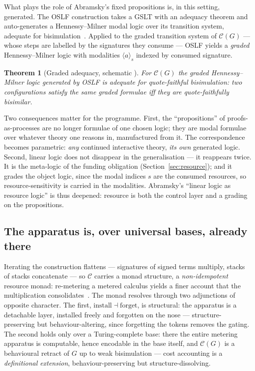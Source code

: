\documentclass[11pt]{article}
\theoremstyle{definition}
\theoremstyle{plain}
\newtheorem{theorem}[definition]{Theorem}
\newcommand{\C}{\mathcal{C}}
\begin{document}
What plays the role of Abramsky's fixed propositions is, in this setting,
generated. The OSLF construction takes a GSLT with an adequacy theorem and
auto-generates a Hennessy--Milner modal logic over its transition system, adequate
for bisimulation~\cite{HM85}. Applied to the graded transition system of $\C(G)$
--- whose steps are labelled by the signatures they consume --- OSLF yields a
\emph{graded} Hennessy--Milner logic with modalities $\langle a \rangle_s$
indexed by consumed signature.

\begin{theorem}[Graded adequacy, schematic {\cite{NoteII}}]
For $\C(G)$ the graded Hennessy--Milner logic generated by OSLF is adequate for
quote-faithful bisimulation: two configurations satisfy the same graded formulae
iff they are quote-faithfully bisimilar.
\end{theorem}

Two consequences matter for the programme. First, the ``propositions'' of
proofs-as-processes are no longer formulae of one chosen logic; they are modal
formulae over whatever theory one reasons in, manufactured from it. The
correspondence becomes parametric: \emph{any} continued interactive theory,
\emph{its own} generated logic. Second, linear logic does not disappear in the
generalisation --- it reappears twice. It is the meta-logic of the funding
obligation (Section~\ref{sec:resource}); and it grades the object logic, since
the modal indices $s$ are the consumed resources, so resource-sensitivity is
carried in the modalities. Abramsky's ``linear logic as resource logic'' is thus
deepened: resource is both the control layer and a grading on the propositions.

\subsection{The apparatus is, over universal bases, already there}

Iterating the construction flattens --- signatures of signed terms multiply,
stacks of stacks concatenate --- so $\C$ carries a monad structure, a
\emph{non-idempotent} resource monad: re-metering a metered calculus yields a
finer account that the multiplication consolidates~\cite{NoteII}. The monad
resolves through two adjunctions of opposite character. The first,
$\mathrm{install} \dashv \mathrm{forget}$, is structural: the apparatus is a
detachable layer, installed freely and forgotten on the nose ---
structure-preserving but behaviour-altering, since forgetting the tokens removes
the gating. The second holds only over a Turing-complete base: there the entire
metering apparatus is computable, hence encodable in the base itself, and $\C(G)$
is a behavioural retract of $G$ up to weak bisimulation --- cost accounting is a
\emph{definitional extension}, behaviour-preserving but structure-dissolving.
\end{document}
